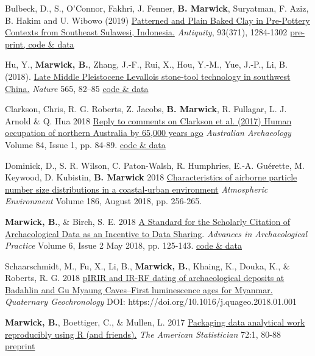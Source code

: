 \documentclass[11pt,article,oneside]{memoir}
\begin{document}
\ind Bulbeck, D., S., O’Connor, Fakhri, J. Fenner,  \textbf{B. Marwick}, Suryatman, F. Aziz, B. Hakim and U. Wibowo (2019) \href{https://doi.org/10.15184/aqy.2019.134}{Patterned and Plain Baked Clay in Pre-Pottery Contexts from Southeast Sulawesi, Indonesia.} \textit{Antiquity}, 93(371), 1284-1302 \href{https://osf.io/jn5tu/}{pre-print, code \& data}

\ind Hu, Y., \textbf{Marwick, B.}, Zhang, J.-F., Rui, X., Hou, Y.-M., Yue, J.-P., Li, B. (2018). \href{https://doi.org/10.1038/s41586-018-0710-1}{Late Middle Pleistocene Levallois stone-tool technology in southwest China.} \textit{Nature}  565, 82–85 \href{https://osf.io/erntj/}{code \& data}

\ind Clarkson, Chris, R. G. Roberts, Z. Jacobs, \textbf{B. Marwick}, R. Fullagar, L. J. Arnold \& Q. Hua 2018 \href{https://doi.org/10.1080/03122417.2018.1462884}{Reply to comments on Clarkson et al. (2017) Human occupation of northern Australia by 65,000 years ago} \textit{Australian Archaeology} Volume 84, Issue 1, pp. 84-89. \href{https://osf.io/qydc9/}{code \& data}

\ind Dominick, D., S. R. Wilson, C. Paton-Walsh, R. Humphries, E.-A. Guérette, M. Keywood, D. Kubistin, \textbf{B. Marwick} 2018 \href{http://doi.org/10.1016/j.atmosenv.2018.05.031}{Characteristics of airborne particle number size distributions in a coastal-urban environment}  \textit{Atmospheric Environment} Volume 186, August 2018, pp. 256-265.

\ind \textbf{Marwick, B.}, \& Birch, S. E. 2018 \href{https://doi.org/10.1017/aap.2018.3}{A Standard for the Scholarly Citation of Archaeological Data as an Incentive to Data Sharing}.  \textit{Advances in Archaeological Practice} Volume 6, Issue 2 May 2018, pp. 125-143. \href{https://doi.org/10.17605/OSF.IO/KSRUZ}{code \& data}

\ind Schaarschmidt, M., Fu, X., Li, B., \textbf{Marwick, B.}, Khaing, K., Douka, K., \& Roberts, R. G. 2018 \href{https://doi.org/10.1016/j.quageo.2018.01.001}{pIRIR and IR-RF dating of archaeological deposits at Badahlin and Gu Myaung Caves–First luminescence ages for Myanmar.} \textit{Quaternary Geochronology} DOI: https://doi.org/10.1016/j.quageo.2018.01.001

\ind \textbf{Marwick, B.}, Boettiger, C., \& Mullen, L. 2017 \href{https://doi.org/10.1080/00031305.2017.1375986}{Packaging data analytical work reproducibly using R (and friends).} \textit{The American Statistician} 72:1, 80-88 \href{https://doi.org/10.7287/peerj.preprints.3192v1}{preprint}
\end{document}
